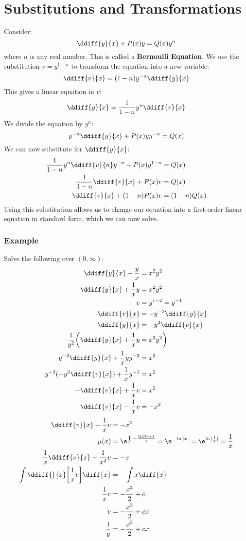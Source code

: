 \documentclass{math}
\begin{document}
\section*{Substitutions and Transformations}
Consider:
\[ \ddiff{y}{x}+P(x)y = Q(x)y^n \]
where \( n \) is any real number. This is called a \textbf{Bernoulli Equation}.
We use the substitution \( v = y^{1-n} \) to transform the equation into a new
variable:
\[ \ddiff{v}{x} = (1-n)y^{-n}\ddiff{y}{x} \]
This gives a linear equation in \( v \):
\[ \ddiff{y}{x} = \frac{1}{1-n}y^n\ddiff{v}{x} \]
We divide the equation by \( y^n \):
\[ y^{-n}\ddiff{y}{x}+P(x)yy^{-n} = Q(x) \]
We can now substitute for \( \ddiff{y}{x} \):
\begin{align*}
  \frac{1}{1-n}y^n\ddiff{v}{n}y^{-n}+P(x)y^{1-n} &= Q(x) \\
  \frac{1}{1-n}\ddiff{v}{x}+P(x)v &= Q(x) \\
  \ddiff{v}{x}+(1-n)P(x)v &= (1-n)Q(x)
\end{align*}
Using this substitution allows us to change our equation into a first-order
linear equation in standard form, which we can now solve.

\subsubsection*{Example}
Solve the following over \( (0,\infty) \):
\begin{align*}
  \ddiff{y}{x}+\frac{y}{x} &= x^2y^2 \\
  \ddiff{y}{x}+\frac{1}{x}y &= x^2y^2 \\
  v &= y^{1-2} = y^{-1} \\
  \ddiff{v}{x} &= -y^{-2}\ddiff{y}{x} \\
  \ddiff{y}{x} &= -y^2\ddiff{v}{x} \\
  \frac{1}{y^2}\bigg(\ddiff{y}{x}+\frac{1}{x}y &= x^2y^2\bigg) \\
  y^{-2}\ddiff{y}{x}+\frac{1}{x}yy^{-2} &= x^2 \\
  y^{-2}(-y^2\ddiff{v}{x})+\frac{1}{x}y^{-1} &= x^2 \\
  -\ddiff{v}{x}+\frac{1}{x}v &= x^2 \\
  \ddiff{v}{x}-\frac{1}{x}v &= -x^2
\end{align*}
\begin{align*}
  \ddiff{v}{x}-\frac{1}{x}v &= -x^2 \\
  \mu(x) &= \e^{\int-\frac{\diff{x}}{x}} = \e^{-\ln|x|} =
    \e^{\ln|\frac{1}{x}|} = \frac{1}{x} \\
  \frac{1}{x}\ddiff{v}{x}-\frac{1}{x^2}v &= -x \\
  \int\ddiff{}{x}\bigg[\frac{1}{x}v\bigg]\diff{x} &= -\int x\diff{x} \\
  \frac{1}{x}v &= -\frac{x^2}{2}+c \\
  v &= -\frac{x^3}{2}+cx \\
  \frac{1}{y} &= -\frac{x^3}{2}+cx
\end{align*}
\end{document}
